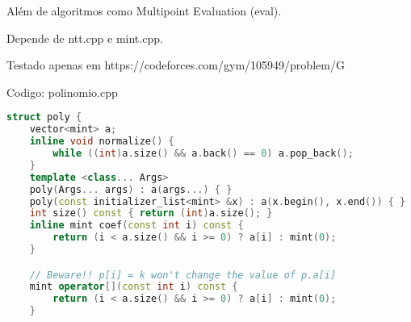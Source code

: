 \documentclass[10pt, a4paper, oneside]{book}
\begin{document}
Além de algoritmos como Multipoint Evaluation (eval). 



Depende de ntt.cpp e mint.cpp.



Testado apenas em https://codeforces.com/gym/105949/problem/G

\hfill

Codigo: polinomio.cpp

\begin{lstlisting}[language=C++]
struct poly {
    vector<mint> a;
    inline void normalize() {
        while ((int)a.size() && a.back() == 0) a.pop_back();
    }
    template <class... Args>
    poly(Args... args) : a(args...) { }
    poly(const initializer_list<mint> &x) : a(x.begin(), x.end()) { }
    int size() const { return (int)a.size(); }
    inline mint coef(const int i) const {
        return (i < a.size() && i >= 0) ? a[i] : mint(0);
    }

    // Beware!! p[i] = k won't change the value of p.a[i]
    mint operator[](const int i) const {
        return (i < a.size() && i >= 0) ? a[i] : mint(0);
    }


\end{lstlisting}
\end{document}
